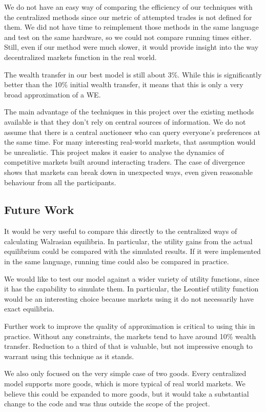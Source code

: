 \documentclass[12pt,a4paper,titlepage]{article}
\begin{document}
We do not have an easy way of comparing the efficiency of our techniques with the centralized methods since our metric of attempted trades is not defined for them.
We did not have time to reimplement those methods in the same language and test on the same hardware, so we could not compare running times either.
Still, even if our method were much slower, it would provide insight into the way decentralized markets function in the real world.

The wealth transfer in our best model is still about 3\%.
While this is significantly better than the 10\% initial wealth transfer, it means that this is only a very broad approximation of a WE.

The main advantage of the techniques in this project over the existing methods available is that they don't rely on central sources of information.
We do not assume that there is a central auctioneer who can query everyone's preferences at the same time.
For many interesting real-world markets, that assumption would be unrealistic.
This project makes it easier to analyse the dynamics of competitive markets built around interacting traders.
The case of divergence shows that markets can break down in unexpected ways, even given reasonable behaviour from all the participants.


\subsection{Future Work}
It would be very useful to compare this directly to the centralized ways of calculating Walrasian equilibria.
In particular, the utility gains from the actual equilibrium could be compared with the simulated results.
If it were implemented in the same language, running time could also be compared in practice.

We would like to test our model against a wider variety of utility functions, since it has the capability to simulate them.
In particular, the Leontief utility function would be an interesting choice because markets using it do not necessarily have exact equilibria.

Further work to improve the quality of approximation is critical to using this in practice.
Without any constraints, the markets tend to have around 10\% wealth transfer. 
Reduction to a third of that is valuable, but not impressive enough to warrant using this technique as it stands.

We also only focused on the very simple case of two goods.
Every centralized model supports more goods, which is more typical of real world markets.
We believe this could be expanded to more goods, but it would take a substantial change to the code and was thus outside the scope of the project.
\end{document}
